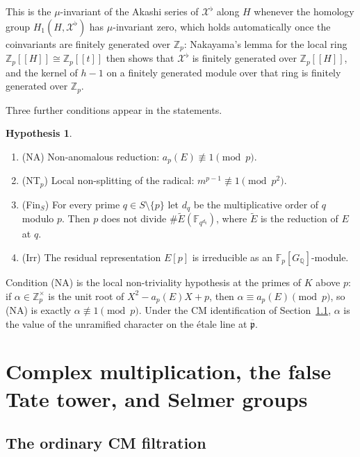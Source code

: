 \documentclass[11pt]{article}
\theoremstyle{definition}
\newtheorem{hypothesis}[theorem]{Hypothesis}
\theoremstyle{remark}
\newcommand{\Z}{\mathbb{Z}}
\newcommand{\Q}{\mathbb{Q}}
\newcommand{\F}{\mathbb{F}}
\newcommand{\flatp}{\flat}
\newcommand{\ppb}{\overline{\mathfrak{p}}}
\newcommand{\cX}{\mathcal{X}}
\begin{document}
This is the \(\mu\)-invariant of the Akashi series of \(\cX^{\flatp}\) along \(H\) whenever the homology group \(H_1(H,\cX^{\flatp})\) has \(\mu\)-invariant zero, which holds automatically once the coinvariants are finitely generated over \(\Z_p\): Nakayama's lemma for the local ring \(\Z_p[[H]]\cong\Z_p[[t]]\) then shows that \(\cX^{\flatp}\) is finitely generated over \(\Z_p[[H]]\), and the kernel of \(h-1\) on a finitely generated module over that ring is finitely generated over \(\Z_p\).

Three further conditions appear in the statements.

\begin{hypothesis}
\label{hyp:extra}
\begin{enumerate}[label=\textup{(\alph*)}]
\item \textup{(NA)} Non-anomalous reduction: \(a_p(E)\not\equiv 1\pmod{p}\).
\item \textup{(NT\(_p\))} Local non-splitting of the radical: \(m^{p-1}\not\equiv 1\pmod{p^2}\).
\item \textup{(Fin\(_S\))} For every prime \(q\in S\setminus\{p\}\) let \(d_q\) be the multiplicative order of \(q\) modulo \(p\). Then \(p\) does not divide \(\#\widetilde{E}(\F_{q^{d_q}})\), where \(\widetilde{E}\) is the reduction of \(E\) at \(q\).
\item \textup{(Irr)} The residual representation \(E[p]\) is irreducible as an \(\F_p[G_\Q]\)-module.
\end{enumerate}
\end{hypothesis}

Condition (NA) is the local non-triviality hypothesis at the primes of \(K\) above \(p\): if \(\alpha\in\Z_p^\times\) is the unit root of \(X^2-a_p(E)X+p\), then \(\alpha\equiv a_p(E)\pmod{p}\), so (NA) is exactly \(\alpha\not\equiv 1\pmod{p}\). Under the CM identification of Section~\ref{sec:cm}, \(\alpha\) is the value of the unramified character on the \'etale line at \(\ppb\).

\section{Complex multiplication, the false Tate tower, and Selmer groups}
\label{sec:prelim}

\subsection{The ordinary CM filtration}
\label{sec:cm}
\end{document}
